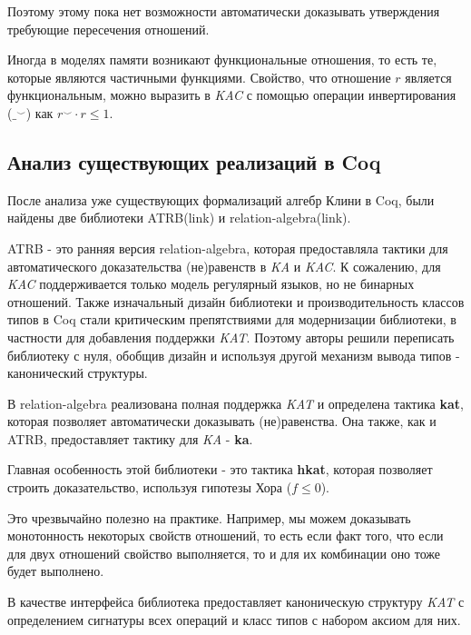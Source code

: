 \documentclass[times
              ]{itmo-student-thesis}
\begin{document}
    Поэтому этому пока нет возможности автоматически доказывать утверждения требующие пересечения отношений.

    Иногда в моделях памяти возникают функциональные отношения, то есть те, которые являются частичными функциями. Свойство, что отношение $ r $ является функциональным, можно выразить в \textit{KAC} с помощью операции инвертирования ($ \_^{\smile} $) как $ r^{\smile} \cdot r \leq 1 $.

  \subsection{Анализ существующих реализаций в Coq}

    После анализа уже существующих формализаций алгебр Клини в Coq, были найдены две библиотеки ATRB(link) и relation-algebra(link).

    ATRB - это ранняя версия relation-algebra, которая предоставляла тактики для автоматического доказательства (не)равенств в \textit{KA} и \textit{KAC}.
    К сожалению, для \textit{KAC} поддерживается только модель регулярный языков, но не бинарных отношений.
    Также изначальный дизайн библиотеки и производительность классов типов в Coq стали критическим препятствиями для модернизации библиотеки,
    в частности для добавления поддержки \textit{KAT}.
    Поэтому авторы решили переписать библиотеку с нуля, обобщив дизайн и используя другой механизм вывода типов - канонический структуры.

    В relation-algebra реализована полная поддержка \textit{KAT} и определена тактика \textbf{kat}, которая позволяет автоматически доказывать (не)равенства.
    Она также, как и ATRB, предоставляет тактику для \textit{KA} - \textbf{ka}.

    Главная особенность этой библиотеки - это тактика \textbf{hkat}, которая позволяет строить доказательство, используя гипотезы Хора ($ f \leq 0 $).

    Это чрезвычайно полезно на практике.
    Например, мы можем доказывать монотонность некоторых свойств отношений,
    то есть если факт того, что если для двух отношений свойство выполняется, то и для их комбинации оно тоже будет выполнено.

    В качестве интерфейса библиотека предоставляет каноническую структуру \textit{KAT} с определением сигнатуры всех операций и класс типов с набором аксиом для них.
\end{document}
